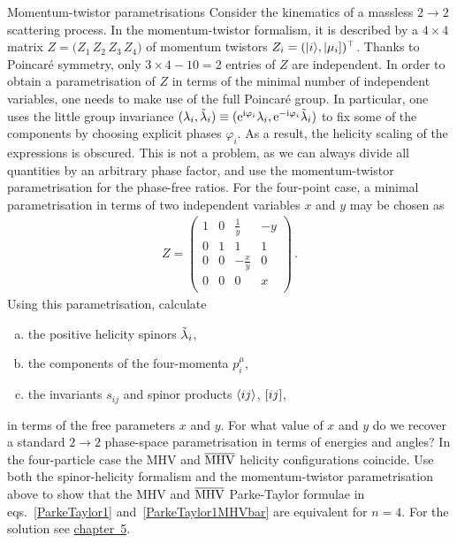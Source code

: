 \begin{exer}{Momentum-twistor parametrisations}
\label{Ex:3.9}
%
Consider the kinematics of a massless $2\to 2$ scattering process. In the momentum-twistor formalism, it is described by a $4\times 4$ matrix $Z = \bigl( Z_1 \, Z_2 \, Z_3 \, Z_4 \bigr)$ of momentum twistors $Z_i = (|i\rangle, |\mu_{i}])^{\top}$. Thanks to Poincar\'e symmetry, only $3\times4-10=2$ entries of $Z$ are independent. 
In order to obtain a parametrisation of $Z$ in terms of the minimal number of independent variables, one needs to make use of the full Poincar\'e group. In particular, one uses the little group invariance $(\lambda_i,\tilde{\lambda}_i) \equiv (\mathrm{e}^{\mathrm{i} \varphi_i} \lambda_i, \mathrm{e}^{-\mathrm{i} \varphi_i} \tilde{\lambda}_i)$ to fix some of the components by choosing explicit phases $\varphi_i$. As a result, the helicity scaling of the expressions is obscured. This is not a problem, as we can always divide all quantities by an arbitrary phase factor, and use the momentum-twistor parametrisation for the phase-free ratios. For the four-point case, a minimal parametrisation in terms of two independent variables $x$ and $y$ may be chosen as
\begin{align} \label{eq:Z4pt}
Z =
  \begin{pmatrix}
    1 & 0 & \frac{1}{y} & -y \\
    0 & 1 & 1 & 1 \\
    0 & 0 & -\frac{x}{y} & 0 \\
    0 & 0 & 0 & x \\
  \end{pmatrix} \,.
\end{align}
Using this parametrisation, calculate
\begin{enumerate}[a)]
  \item the positive helicity spinors $\tilde\lambda_i$,
  \item the components of the four-momenta $p_i^\mu$,
  \item the invariants $s_{ij}$ and spinor products $\langle i j \rangle$, $[ i j ]$,
\end{enumerate}
in terms of the free parameters $x$ and $y$. For what value of $x$ and $y$ do we
recover a standard $2\to2$ phase-space parametrisation in terms of energies and angles?
In the four-particle case the MHV and $\overline{\rm MHV}$ helicity configurations coincide. 
Use both the spinor-helicity formalism and the momentum-twistor parametrisation above to show that the MHV and $\overline{\rm MHV}$ Parke-Taylor formulae in eqs.~\eqref{ParkeTaylor1} and~\eqref{ParkeTaylor1MHVbar} are equivalent for $n=4$.
For the solution see \hyperref[Sol:3.9]{chapter~5}.
\end{exer}


